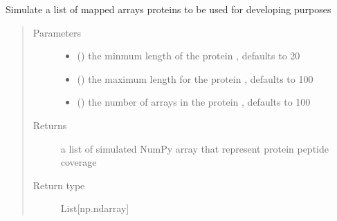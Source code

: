 \documentclass[letterpaper,10pt,english]{sphinxmanual}
\begin{document}
\begin{fulllineitems}
\label{\detokenize{IPTK.Utils:IPTK.Utils.DevFunctions.simulate_mapped_array_list}}
Simulate a list of mapped arrays proteins to be used for developing purposes
\begin{quote}\begin{description}
\item[{Parameters}] \leavevmode\begin{itemize}
\item {} 
 (\sphinxstyleliteralemphasis{\sphinxupquote{, }}) \textendash{} the minmum length of the protein , defaults to 20

\item {} 
 (\sphinxstyleliteralemphasis{\sphinxupquote{, }}) \textendash{} the maximum length for the protein , defaults to 100

\item {} 
 (\sphinxstyleliteralemphasis{\sphinxupquote{, }}) \textendash{} the number of arrays in the protein , defaults to 100

\end{itemize}

\item[{Returns}] \leavevmode
a list of simulated NumPy array that represent protein peptide coverage

\item[{Return type}] \leavevmode
List{[}np.ndarray{]}

\end{description}\end{quote}

\end{fulllineitems}
\end{document}
